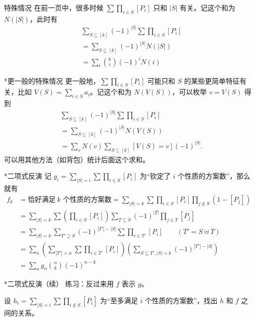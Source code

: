 \begin{frame}{特殊情况}
    在前一页中，很多时候 $\sum\prod_{i\in S}[P_i]$ 只和 $|S|$ 有关。记这个和为 $N(|S|)$，此时有
    $$
    \begin{aligned}
    &\sum_{S\subseteq [k]} (-1)^{|S|}\sum \prod_{i\in S}[P_i]\\
    &=\sum_{S\subseteq [k]}(-1)^{|S|}N(|S|)\\
    &=\sum_i\binom{k}{i}(-1)^i N(i)
    \end{aligned}
    $$
\end{frame}
\begin{frame}{*更一般的特殊情况}
    更一般地，$\sum\prod_{i\in S}[P_i]$ 可能只和 $S$ 的某些更简单特征有关，比如 $V(S)=\sum_{i\in S}a_i$。记这个和为 $N(V(S))$，可以枚举 $v=V(S)$ 得到
    $$
    \begin{aligned}
        &\sum_{S\subseteq [k]} (-1)^{|S|}\sum \prod_{i\in S}[P_i]\\
        &=\sum_{S\subseteq [k]}(-1)^{|S|}N(V(S))\\
        &=\sum_v N(v)\sum_{S\subseteq [k]}[V(S)=v](-1)^{|S|}.
    \end{aligned}
    $$    
    可以用其他方法（如背包）统计后面这个求和。
\end{frame}
\begin{frame}{*二项式反演}
    记 $g_i=\sum_{|S|=i}\sum\prod_{i\in S}[P_i]$ 为“钦定了 $i$ 个性质的方案数”，那么就有
    $$
    \begin{aligned}
    f_k&=\text{恰好满足}\ k\text{ 个性质的方案数}=\sum_{|S|=k}\sum \prod_{i\in S}[P_i]\prod_{j\notin S}(1-[P_j])\\
    &=\sum_{|S|=k}\sum\left(\prod_{i\in S}[P_i]\right)\sum_{T\subseteq \bar S}(-1)^{|T|}\prod_{j\in T}[P_j]\\
    &=\sum_{|S|=k}\sum_{T'\supseteq S}(-1)^{|T'|-|S|}\sum\prod_{i\in T'}[P_i]\qquad(T'=S\uplus T)\\
    &=\sum_{n}\left(\sum_{|T'|=n}\sum\prod_{i\in T'}[P_i]\right)\left(\sum_{S\subseteq T',|S|=k}(-1)^{|T'|-|S|}\right)\\
    &=\sum_n g_n\binom{n}{k}(-1)^{n-k}
    \end{aligned}
    $$
\end{frame}
\begin{frame}{*二项式反演（续）}
    练习：反过来用 $f$ 表示 $g$。
    
    设 $h_i=\sum_{|S|=i}\sum\prod_{i\notin S}[\overline{P_i}]$ 为“至多满足 $i$ 个性质的方案数”，找出 $h$ 和 $f$ 之间的关系。
\end{frame}
